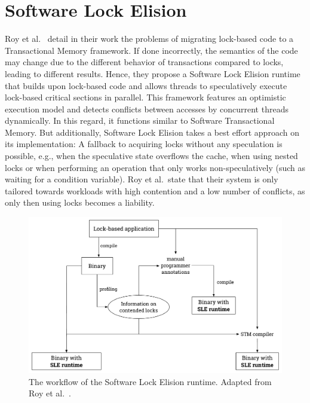 \section{Software Lock Elision}%
\label{sec:related:sle}
Roy et al.~\cite{roy2009runtime} detail in their work the problems of migrating lock-based code to a Transactional Memory framework.
If done incorrectly, the semantics of the code may change due to the different behavior of transactions compared to locks, leading to different results.
Hence, they propose a Software Lock Elision runtime that builds upon lock-based code and allows threads to speculatively execute lock-based critical sections in parallel.
This framework features an optimistic execution model and detects conflicts between accesses by concurrent threads dynamically.
In this regard, it functions similar to Software Transactional Memory.
But additionally, Software Lock Elision takes a best effort approach on its implementation:
A fallback to acquiring locks without any speculation is possible, e.g., when the speculative state overflows the cache, when using nested locks or when performing an operation that only works non-speculatively (such as waiting for a condition variable).
Roy et al.\ state that their system is only tailored towards workloads with high contention and a low number of conflicts, as only then using locks becomes a liability.

\begin{figure}
    \centering
    \includegraphics[width=.9\textwidth,keepaspectratio]{gfx/related/sle}
    \caption{The workflow of the Software Lock Elision runtime. Adapted from Roy et al.~\cite{roy2009runtime}.}%
    \label{fig:related:sle}
\end{figure}

